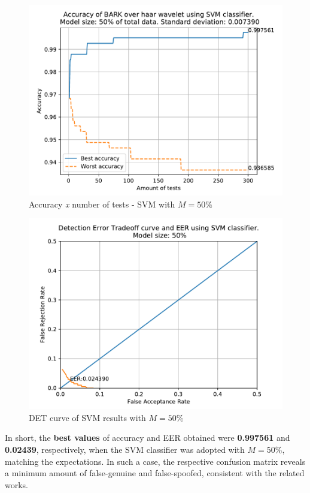 		\begin{figure}[H]
			\centering
			\includegraphics[scale=.8]{images/results/confusionMatrices/classifier_SVM_50.pdf}
			\caption{Accuracy \textit{x} number of tests - SVM with $M=50\%$}
			\label{fig:classifiersvm50}
		\end{figure}
		\begin{figure}[H]
			\centering
			\includegraphics[scale=.8]{images/results/det/DET_for_classifier_SVM_50.pdf}
			\caption{DET curve of SVM results with $M=50\%$}
			\label{fig:detsvm50}
		\end{figure}
	
		\par In short, the \textbf{best values} of accuracy and EER obtained were \textbf{0.997561} and \textbf{0.02439}, respectively, when the SVM classifier was adopted with $M=50\%$, matching the expectations. In such a case, the respective confusion matrix reveals a minimum amount of false-genuine and false-spoofed, consistent with the related works.
		\\
		\FloatBarrier
